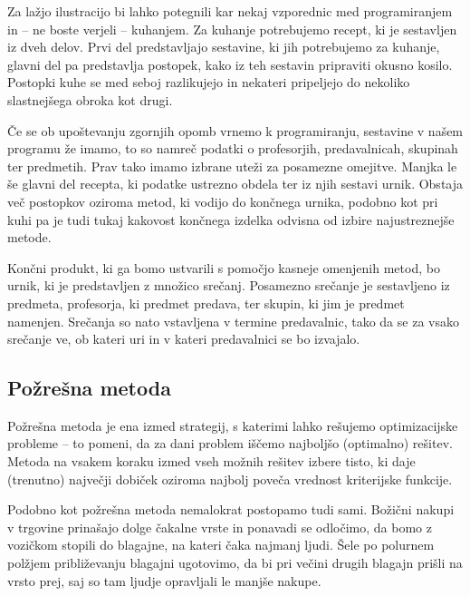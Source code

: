\documentclass[10pt, a4paper]{article}
\begin{document}
Za lažjo ilustracijo bi lahko potegnili kar nekaj vzporednic med programiranjem in -- ne
boste verjeli -- kuhanjem. Za kuhanje potrebujemo recept, ki je sestavljen iz dveh delov.
Prvi del predstavljajo sestavine, ki jih potrebujemo za kuhanje, glavni del pa predstavlja
postopek, kako iz teh sestavin pripraviti okusno kosilo. Postopki kuhe se med seboj
razlikujejo in nekateri pripeljejo do nekoliko slastnejšega obroka kot drugi.

Če se ob upoštevanju zgornjih opomb vrnemo k programiranju, sestavine v našem programu že
imamo, to so namreč podatki o profesorjih, predavalnicah, skupinah ter predmetih. Prav tako
imamo izbrane uteži za posamezne omejitve. Manjka le še glavni del recepta, ki podatke
ustrezno obdela ter iz njih sestavi urnik. Obstaja več postopkov oziroma metod, ki vodijo
do končnega urnika, podobno kot pri kuhi pa je tudi tukaj kakovost končnega izdelka odvisna
od izbire najustreznejše metode.

Končni produkt, ki ga bomo ustvarili s pomočjo kasneje omenjenih metod, bo urnik, ki je
predstavljen z množico srečanj. Posamezno srečanje je sestavljeno iz predmeta,
profesorja, ki predmet predava, ter skupin, ki jim je predmet namenjen. Srečanja so nato
vstavljena v termine predavalnic, tako da se za vsako srečanje ve, ob kateri uri in v
kateri predavalnici se bo izvajalo.

\subsection{Požrešna metoda}

Požrešna metoda je ena izmed strategij, s katerimi lahko rešujemo optimizacijske probleme --
to pomeni, da za dani problem iščemo najboljšo (optimalno) rešitev. Metoda na vsakem koraku
izmed vseh možnih rešitev izbere  tisto, ki daje (trenutno) največji dobiček oziroma najbolj
poveča vrednost kriterijske funkcije.

Podobno kot požrešna metoda nemalokrat postopamo tudi sami. Božični nakupi v trgovine
prinašajo dolge čakalne vrste in ponavadi se odločimo, da bomo z vozičkom stopili do blagajne,
na kateri čaka najmanj ljudi. Šele po polurnem polžjem približevanju blagajni ugotovimo,
da bi pri večini drugih blagajn prišli na vrsto prej, saj so tam ljudje opravljali le
manjše nakupe.
\end{document}
